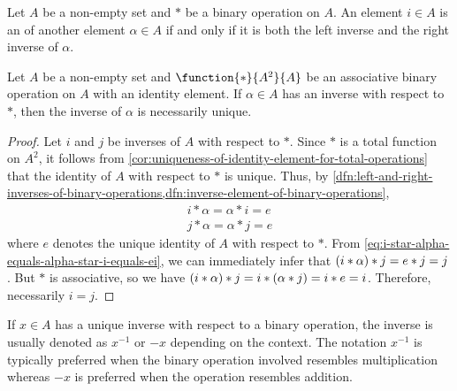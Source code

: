 \begin{dfn}
    \label{dfn:inverse-element-of-binary-operations}
    Let \( A \) be a non-empty set and \( \ast \) be a binary operation on \( A \). An element \( i \in A \) is an 
    of another element \( \alpha \in A \) if and only if it is both the left inverse and the right inverse of \( \alpha \).
\end{dfn}

\begin{thm}
    \label{thm:uniqueness-of-inverse-element-for-total-associative-binary-operations}
    Let \( A \) be a non-empty set and \( \function{\ast}{A^{2}}{A} \) be an associative binary operation on \( A \) with an identity element.
    If \( \alpha \in A \) has an inverse with respect to \( \ast \), then the inverse of \( \alpha \)
    is necessarily unique.
\end{thm}

\begin{proof}
    Let \( i \) and \( j \) be inverses of \( A \) with respect to \( \ast \). Since \( \ast \) is a total function on \( A^{2} \),
    it follows from \cref{cor:uniqueness-of-identity-element-for-total-operations}
    that the identity of \( A \) with respect to \( \ast \) is unique.
    Thus, by \cref{dfn:left-and-right-inverses-of-binary-operations,dfn:inverse-element-of-binary-operations},
    \begin{gather}
        i \ast \alpha = \alpha \ast i = e \label{eq:i-star-alpha-equals-alpha-star-i-equals-ei}\\
        j \ast \alpha = \alpha \ast j = e \label{eq:j-star-alpha-equals-alpha-star-i-equals-ej}
    \end{gather}
    where \( e \) denotes the unique identity of \( A \) with respect to \( \ast \).
    From \eqref{eq:i-star-alpha-equals-alpha-star-i-equals-ei}, we can immediately infer that
    \( \mleft( i \ast \alpha \mright) \ast j = e \ast j = j \).
    But \( \ast \) is associative, so we have
    \( \mleft( i \ast \alpha \mright) \ast j = i \ast \mleft( \alpha \ast j \mright) = i \ast e = i \). Therefore, necessarily \( i = j \).
\end{proof}

\begin{notation}
     \label{notation:inverse-element-of-binary-operations}
    If \( x \in A \) has a unique inverse with respect to a binary operation, the inverse is usually denoted as \( x^{-1} \) or \( -x \) depending on
    the context. The notation \( x^{-1} \) is typically preferred when the binary operation involved resembles multiplication
    whereas \( -x \) is preferred when the operation resembles addition.
\end{notation}

